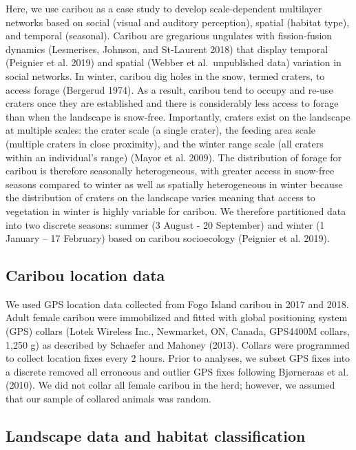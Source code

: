 \documentclass[]{article}
\begin{document}
Here, we use caribou as a case study to develop scale-dependent multilayer
networks based on social (visual and auditory perception), spatial (habitat
type), and temporal (seasonal). Caribou are gregarious ungulates with
fission-fusion dynamics (Lesmerises, Johnson, and St-Laurent 2018) that display temporal
(Peignier et al. 2019) and spatial (Webber et al.~unpublished data) variation in
social networks. In winter, caribou dig holes in the snow, termed craters, to
access forage (Bergerud 1974). As a result, caribou tend to occupy
and re-use craters once they are established and there is considerably less
access to forage than when the landscape is snow-free. Importantly, craters
exist on the landscape at multiple scales: the crater scale (a single crater),
the feeding area scale (multiple craters in close proximity), and the winter
range scale (all craters within an individual's range) (Mayor et al. 2009). The
distribution of forage for caribou is therefore seasonally heterogeneous, with
greater access in snow-free seasons compared to winter as well as spatially
heterogeneous in winter because the distribution of craters on the landscape
varies meaning that access to vegetation in winter is highly variable for
caribou. We therefore partitioned data into two discrete seasons: summer (3
August - 20 September) and winter (1 January -- 17 February) based on caribou
socioecology (Peignier et al. 2019).

\hypertarget{caribou-location-data}{%
\subsection{Caribou location data}\label{caribou-location-data}}

We used GPS location data collected from Fogo Island caribou in 2017 and 2018.
Adult female caribou were immobilized and fitted with global positioning system
(GPS) collars (Lotek Wireless Inc., Newmarket, ON, Canada, GPS4400M collars,
1,250 g) as described by Schaefer and Mahoney (2013). Collars were programmed to
collect location fixes every 2 hours. Prior to analyses, we subset GPS fixes
into a discrete removed all erroneous and outlier GPS fixes following Bjørneraas
et al. (2010). We did not collar all female caribou in the herd;
however, we assumed that our sample of collared animals was random.

\hypertarget{landscape-data-and-habitat-classification}{%
\subsection{Landscape data and habitat classification}\label{landscape-data-and-habitat-classification}}
\end{document}
